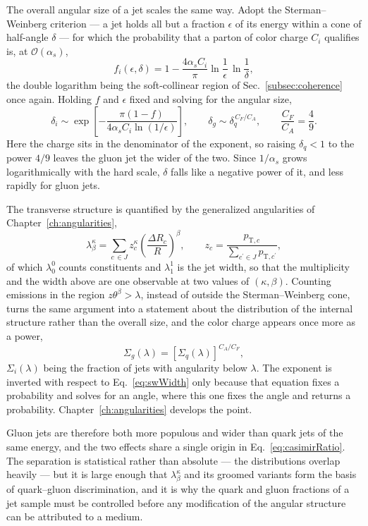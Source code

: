 The overall angular size of a jet scales the same way. Adopt the
Sterman--Weinberg criterion --- a jet holds all but a fraction \(\epsilon\) of its
energy within a cone of half-angle \(\delta\) --- for which the probability that a
parton of color charge \(C_i\) qualifies is, at \(\mathcal{O}(\alpha_s)\),
\begin{equation}
	f_i(\epsilon,\delta) = 1 - \frac{4\alpha_s C_i}{\pi}
	\ln\frac{1}{\epsilon}\,\ln\frac{1}{\delta} ,
	\label{eq:stermanWeinberg}
\end{equation}
the double logarithm being the soft-collinear region of Sec.~\ref{subsec:coherence}
once again. Holding \(f\) and \(\epsilon\) fixed and solving for the angular size,
\begin{equation}
	\delta_i \sim \exp\left[-\frac{\pi(1-f)}{4\alpha_s C_i\ln(1/\epsilon)}\right],
	\qquad
	\delta_g \sim \delta_q^{\,C_F/C_A} ,
	\qquad
	\frac{C_F}{C_A} = \frac{4}{9} .
	\label{eq:swWidth}
\end{equation}
Here the charge sits in the denominator of the exponent, so raising \(\delta_q<1\) to
the power \(4/9\) leaves the gluon jet the wider of the two. Since \(1/\alpha_s\)
grows logarithmically with the hard scale, \(\delta\) falls like a negative power of
it, and less rapidly for gluon jets.

The transverse structure is quantified by the generalized angularities of
Chapter~\ref{ch:angularities},
\begin{equation}
	\lambda^\kappa_\beta = \sum_{c\,\in J} z_c^\kappa
	\left(\frac{\Delta R_c}{R}\right)^{\beta},
	\qquad
	z_c = \frac{p_{\mathrm{T},c}}{\sum_{c^\prime\in J}p_{\mathrm{T},c^\prime}},
	\label{eq:angularityDef}
\end{equation}
of which \(\lambda^0_0\) counts constituents and \(\lambda^1_1\) is the jet width, so
that the multiplicity and the width above are one observable at two values of
\((\kappa,\beta)\). Counting emissions in the region \(z\theta^\beta>\lambda\),
instead of outside the Sterman--Weinberg cone, turns the same argument into a
statement about the distribution of the internal structure rather than the overall
size, and the color charge appears once more as a power,
\begin{equation}
	\Sigma_g(\lambda) = \left[\Sigma_q(\lambda)\right]^{C_A/C_F} ,
	\label{eq:casimirPower}
\end{equation}
\(\Sigma_i(\lambda)\) being the fraction of jets with angularity below \(\lambda\).
The exponent is inverted with respect to Eq.~\ref{eq:swWidth} only because that
equation fixes a probability and solves for an angle, where this one fixes the angle
and returns a probability. Chapter~\ref{ch:angularities} develops the point.

Gluon jets are therefore both more populous
and wider than quark jets of the same energy, and the two effects share a single
origin in Eq.~\ref{eq:casimirRatio}. The separation is statistical rather than
absolute --- the distributions overlap heavily --- but it is large enough that
\(\lambda^\kappa_\beta\) and its groomed variants form the basis of quark--gluon
discrimination, and it is why the quark and gluon fractions of a jet sample must be
controlled before any modification of the angular structure can be attributed to a
medium.
